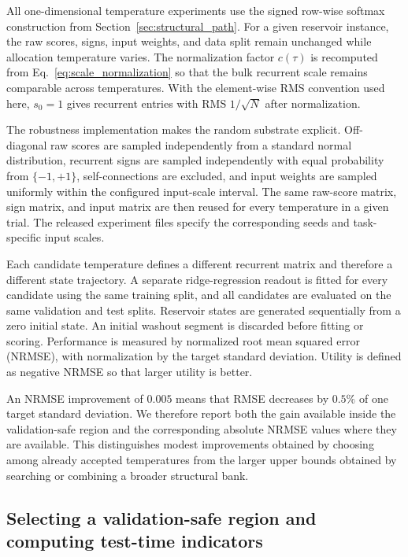 \documentclass[11pt,a4paper]{article}
\begin{document}
All one-dimensional temperature experiments use the signed row-wise softmax construction from Section~\ref{sec:structural_path}. For a given reservoir instance, the raw scores, signs, input weights, and data split remain unchanged while allocation temperature varies. The normalization factor $c(\tau)$ is recomputed from Eq.~\eqref{eq:scale_normalization} so that the bulk recurrent scale remains comparable across temperatures. With the element-wise RMS convention used here, $s_0=1$ gives recurrent entries with RMS $1/\sqrt{N}$ after normalization.

The robustness implementation makes the random substrate explicit. Off-diagonal raw scores are sampled independently from a standard normal distribution, recurrent signs are sampled independently with equal probability from $\{-1,+1\}$, self-connections are excluded, and input weights are sampled uniformly within the configured input-scale interval. The same raw-score matrix, sign matrix, and input matrix are then reused for every temperature in a given trial. The released experiment files specify the corresponding seeds and task-specific input scales.

Each candidate temperature defines a different recurrent matrix and therefore a different state trajectory. A separate ridge-regression readout is fitted for every candidate using the same training split, and all candidates are evaluated on the same validation and test splits. Reservoir states are generated sequentially from a zero initial state. An initial washout segment is discarded before fitting or scoring. Performance is measured by normalized root mean squared error (NRMSE), with normalization by the target standard deviation. Utility is defined as negative NRMSE so that larger utility is better.

An NRMSE improvement of $0.005$ means that RMSE decreases by $0.5\%$ of one target standard deviation. We therefore report both the gain available inside the validation-safe region and the corresponding absolute NRMSE values where they are available. This distinguishes modest improvements obtained by choosing among already accepted temperatures from the larger upper bounds obtained by searching or combining a broader structural bank.

\subsection{Selecting a validation-safe region and computing test-time indicators}
\label{sec:safe_region_methods}
\end{document}
